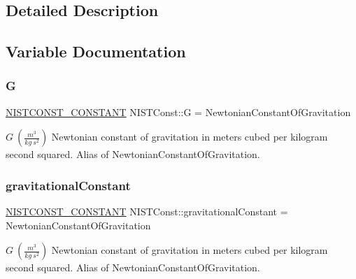 \subsection{Detailed Description}


\subsection{Variable Documentation}
\mbox{\label{group___n_i_s_t_const-_gravitational_constant_ga99d2961d6c5c892fb90c8f1b36f5fcd8}} 
\subsubsection{\texorpdfstring{G}{G}}
{\footnotesize\ttfamily \mbox{\hyperlink{group___n_i_s_t_const-_macros_ga2b0fc1d7452373f816175dd86ce26729}{N\+I\+S\+T\+C\+O\+N\+S\+T\+\_\+\+C\+O\+N\+S\+T\+A\+NT}} N\+I\+S\+T\+Const\+::G = Newtonian\+Constant\+Of\+Gravitation}

$G \ (\frac{m^3}{kg\ s^2})$ Newtonian constant of gravitation in meters cubed per kilogram second squared. Alias of Newtonian\+Constant\+Of\+Gravitation. \mbox{\label{group___n_i_s_t_const-_gravitational_constant_gae20aa18e6ec2c075d2b5a6af18f30b5f}} 
\subsubsection{\texorpdfstring{gravitational\+Constant}{gravitationalConstant}}
{\footnotesize\ttfamily \mbox{\hyperlink{group___n_i_s_t_const-_macros_ga2b0fc1d7452373f816175dd86ce26729}{N\+I\+S\+T\+C\+O\+N\+S\+T\+\_\+\+C\+O\+N\+S\+T\+A\+NT}} N\+I\+S\+T\+Const\+::gravitational\+Constant = Newtonian\+Constant\+Of\+Gravitation}

$G \ (\frac{m^3}{kg\ s^2})$ Newtonian constant of gravitation in meters cubed per kilogram second squared. Alias of Newtonian\+Constant\+Of\+Gravitation. \mbox{\label{group___n_i_s_t_const-_gravitational_constant_gacfed5fae03e441055c1f09406a47f8ce}} 
